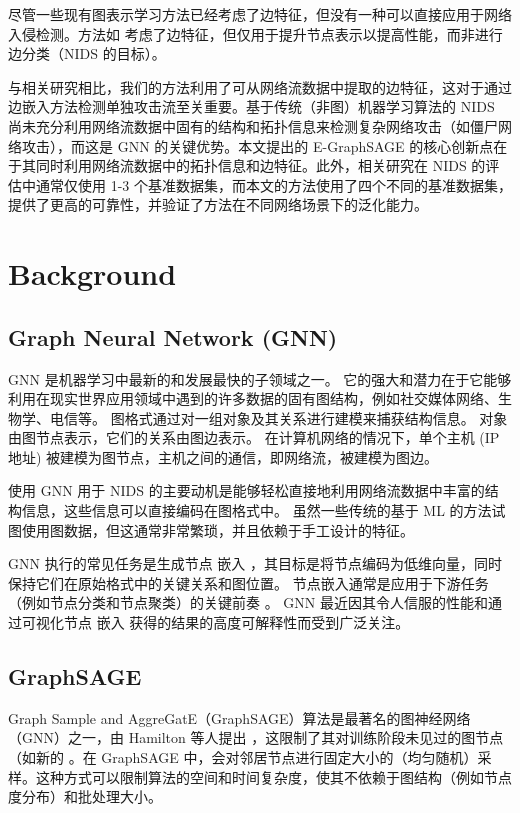 \documentclass{article}
\begin{document}
尽管一些现有图表示学习方法已经考虑了边特征，但没有一种可以直接应用于网络入侵检测。方法如
\cite{gong2019exploitingedgefeaturesgraph}
\cite{gilmer2017neuralmessagepassingquantum}
考虑了边特征，但仅用于提升节点表示以提高性能，而非进行边分类（NIDS 的目标）。

与相关研究相比，我们的方法利用了可从网络流数据中提取的边特征，这对于通过边嵌入方法检测单独攻击流至关重要。基于传统（非图）机器学习算法的
NIDS 尚未充分利用网络流数据中固有的结构和拓扑信息来检测复杂网络攻击（如僵尸网络攻击），而这是 GNN 的关键优势。本文提出的
E-GraphSAGE 的核心创新点在于其同时利用网络流数据中的拓扑信息和边特征。此外，相关研究在 NIDS 的评估中通常仅使用 1-3
个基准数据集，而本文的方法使用了四个不同的基准数据集，提供了更高的可靠性，并验证了方法在不同网络场景下的泛化能力。

\section{Background}

\subsection{Graph Neural Network (GNN)}

GNN 是机器学习中最新的和发展最快的子领域之一。
它的强大和潜力在于它能够利用在现实世界应用领域中遇到的许多数据的固有图结构，例如社交媒体网络、生物学、电信等。
图格式通过对一组对象及其关系进行建模来捕获结构信息。 对象由图节点表示，它们的关系由图边表示。 在计算机网络的情况下，单个主机 (IP
地址) 被建模为图节点，主机之间的通信，即网络流，被建模为图边。

使用 GNN 用于 NIDS 的主要动机是能够轻松直接地利用网络流数据中丰富的结构信息，这些信息可以直接编码在图格式中。
虽然一些传统的基于 ML 的方法试图使用图数据，但这通常非常繁琐，并且依赖于手工设计的特征。

GNN 执行的常见任务是生成节点 嵌入
\cite{cai2018comprehensivesurveygraphembedding}，其目标是将节点编码为低维向量，同时保持它们在原始格式中的关键关系和图位置。
节点嵌入通常是应用于下游任务（例如节点分类和节点聚类）的关键前奏
\cite{cai2018comprehensivesurveygraphembedding}。 GNN
最近因其令人信服的性能和通过可视化节点 嵌入 \cite{zhou2021graphneuralnetworksreview}
获得的结果的高度可解释性而受到广泛关注。

\subsection{GraphSAGE}

Graph Sample and AggreGatE（GraphSAGE）算法是最著名的图神经网络（GNN）之一，由 Hamilton
等人提出
\cite{hamilton2018inductiverepresentationlearninglarge}，这限制了其对训练阶段未见过的图节点（如新的
。在 GraphSAGE
中，会对邻居节点进行固定大小的（均匀随机）采样。这种方式可以限制算法的空间和时间复杂度，使其不依赖于图结构（例如节点度分布）和批处理大小。
\end{document}
